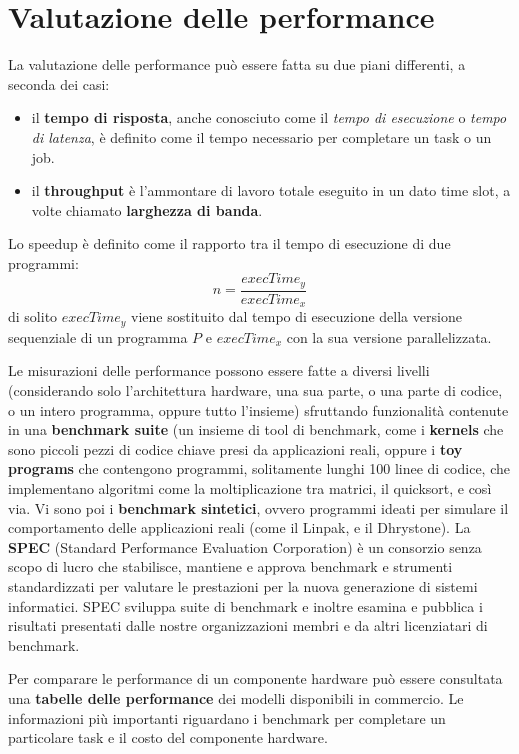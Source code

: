 \section{Valutazione delle performance}
La valutazione delle performance può essere fatta su due piani differenti, a seconda dei casi:
\begin{itemize}
    \item il \textbf{tempo di risposta}, anche conosciuto come il \emph{tempo di esecuzione} o \emph{tempo di latenza}, è definito come il tempo necessario per completare un task o un job.

\item il \textbf{throughput} è l'ammontare di lavoro totale eseguito in un dato time slot, a volte chiamato \textbf{larghezza di banda}.
\end{itemize}

Lo speedup è definito come il rapporto tra il tempo di esecuzione di due programmi:
\begin{equation*}
	n=\frac{execTime_y}{execTime_x}
\end{equation*}
di solito $execTime_y$ viene sostituito dal tempo di esecuzione della versione sequenziale di un programma $P$ e $execTime_x$ con la sua versione parallelizzata.

Le misurazioni delle performance possono essere fatte a diversi livelli (considerando solo l'architettura hardware, una sua parte, o una parte di codice, o un intero programma, oppure tutto l'insieme) sfruttando funzionalità contenute in una \textbf{benchmark suite} (un insieme di tool di benchmark, come i \textbf{kernels} che sono piccoli pezzi di codice chiave presi da applicazioni reali, oppure i \textbf{toy programs} che contengono programmi, solitamente lunghi 100 linee di codice, che implementano algoritmi come la moltiplicazione tra matrici, il quicksort, e così via. Vi sono poi i \textbf{benchmark sintetici}, ovvero programmi ideati per simulare il comportamento delle applicazioni reali (come il Linpak, e il Dhrystone). La \textbf{SPEC} (Standard Performance Evaluation Corporation) è un consorzio senza scopo di lucro che stabilisce, mantiene e approva benchmark e strumenti standardizzati per valutare le prestazioni per la nuova generazione di sistemi informatici. SPEC sviluppa suite di benchmark e inoltre esamina e pubblica i risultati presentati dalle nostre organizzazioni membri e da altri licenziatari di benchmark.

Per comparare le performance di un componente hardware può essere consultata una \textbf{tabelle delle performance} dei modelli disponibili in commercio. Le informazioni più importanti riguardano i benchmark per completare un particolare task e il costo del componente hardware.

